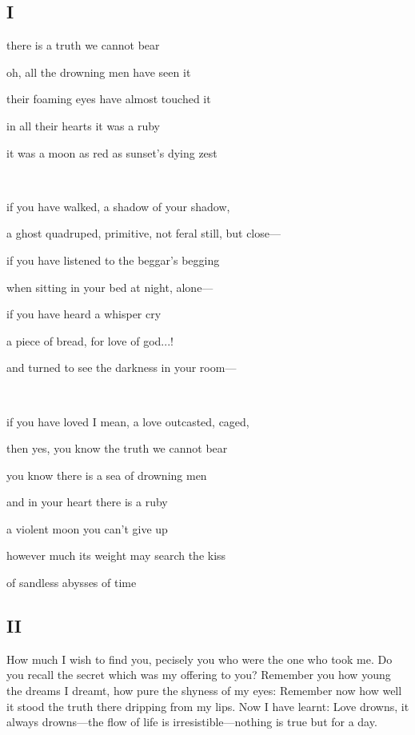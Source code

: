 \documentclass[a4paper, 12pt]{article}
\begin{document}
\subsection{I}

   there is a truth we cannot bear

   oh, all the drowning men have seen it

   their foaming eyes have almost touched it 

   in all their hearts it was a ruby 

   it was a moon as red as sunset's dying zest

   ~ ~ ~ 

   if you have walked, a shadow of your shadow,
   
   a ghost quadruped, primitive, not feral still, but close---

   if you have listened to the beggar's begging

   when sitting in your bed at night, alone--- 

   if you have heard a whisper cry 
   
   a piece of bread, for love of god...!

   and turned to see the darkness in your room---

   ~ ~ ~ 

   if you have loved I mean, a love outcasted, caged,

   then yes, you know the truth we cannot bear 

   you know there is a sea of drowning men 

   and in your heart there is a ruby 

   a violent moon you can't give up

   however much its weight may search the kiss 

   of sandless abysses of time




   \pagebreak

   \subsection{II}

How much I wish to find you, pecisely you who were the one who took me. Do you
recall the secret which was my offering to you? Remember you how young the
dreams I dreamt, how pure the shyness of my eyes: Remember now how well it stood 
the truth there dripping from my lips. Now I have learnt: Love drowns, it
always drowns---the flow of life is irresistible---nothing is true but for a
day.
\end{document}
